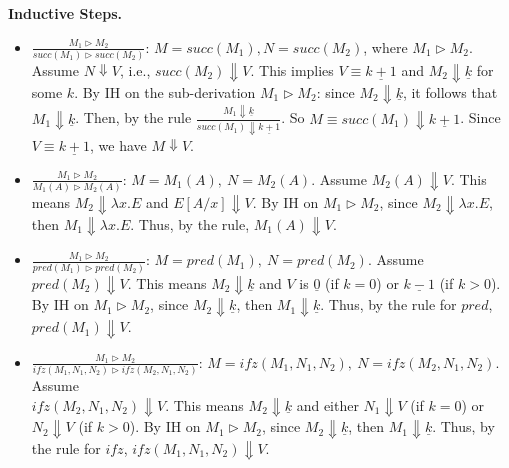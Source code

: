     \textbf{Inductive Steps.}
    \begin{itemize}
        \item $\frac{M_1 \rhd M_2}{succ(M_1) \rhd succ(M_2)}$: $M = succ(M_1), N = succ(M_2)$, where $M_1 \rhd M_2$. Assume $N \Downarrow V$, i.e., $succ(M_2) \Downarrow V$. 
              This implies $V \equiv \underline{k+1}$ and $M_2 \Downarrow \underline{k}$ for some $k$.
              By IH on the sub-derivation $M_1 \triangleright M_2$: since $M_2 \Downarrow \underline{k}$, it follows that $M_1 \Downarrow \underline{k}$.
              Then, by the rule $\frac{M_1 \Downarrow \underline{k}}{succ(M_1) \Downarrow \underline{k+1}}$.
              So $M \equiv succ(M_1) \Downarrow \underline{k+1}$. Since $V \equiv \underline{k+1}$, we have $M \Downarrow V$.
 

        \item $\frac{M_1 \rhd M_2}{M_1(A) \rhd M_2(A)}$: $M = M_1(A),\ N = M_2(A)$. Assume $M_2(A) \Downarrow V$. 
              This means $M_2 \Downarrow \lambda x.E$ and $E[A/x] \Downarrow V$. By IH on $M_1 \rhd M_2$, since $M_2 \Downarrow \lambda x.E$, 
                then $M_1 \Downarrow \lambda x.E$. Thus, by the rule, $M_1(A) \Downarrow V$.
    
        \item $\frac{M_1 \rhd M_2}{pred(M_1) \rhd pred(M_2)}$: $M = pred(M_1),\ N = pred(M_2)$. 
              Assume $pred(M_2) \Downarrow V$. This means $M_2 \Downarrow \underline{k}$ and $V$ is $\underline{0}$ (if $k = 0$) 
                or $\underline{k-1}$ (if $k > 0$). By IH on $M_1 \rhd M_2$, since $M_2 \Downarrow \underline{k}$, 
                    then $M_1 \Downarrow \underline{k}$. Thus, by the rule for $pred$, $pred(M_1) \Downarrow V$.
    
        \item $\frac{M_1 \rhd M_2}{ifz(M_1, N_1, N_2) \rhd ifz(M_2, N_1, N_2)}$: $M = ifz(M_1, N_1, N_2),\ N = ifz(M_2, N_1, N_2)$. 
              Assume \\
              $ifz(M_2, N_1, N_2) \Downarrow V$. This means $M_2 \Downarrow \underline{k}$ and either $N_1 \Downarrow V$ (if $k = 0$) or $N_2 \Downarrow V$ (if $k > 0$). 
              By IH on $M_1 \rhd M_2$, since $M_2 \Downarrow \underline{k}$, then $M_1 \Downarrow \underline{k}$. 
              Thus, by the rule for $ifz$, $ifz(M_1, N_1, N_2) \Downarrow V$.

    \end{itemize}

